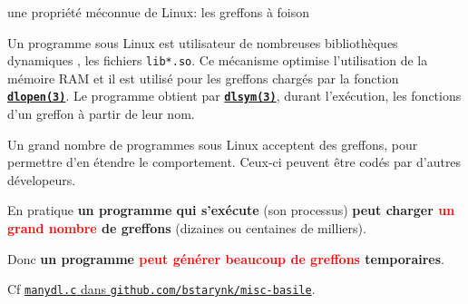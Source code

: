 \documentclass[final,a4,xcolor={svgnames,dvipsnames}]{beamer}
\begin{document}
 \begin{frame}{une propriété méconnue de Linux: les greffons à foison}


   Un programme sous Linux est {}
   utilisateur de nombreuses bibliothèques dynamiques
   {}, les fichiers
   \texttt{lib*.so}. Ce mécanisme optimise l'utilisation de la mémoire
   RAM et il est utilisé pour les greffons
   {} chargés par la fonction
   \textbf{\texttt{\href{https://man7.org/linux/man-pages/man3/dlopen.3.html}{dlopen(3)}}}. Le
   programme obtient par
   \textbf{\texttt{\href{https://man7.org/linux/man-pages/man3/dlsym.3.html}{dlsym(3)}}},
   durant l'exécution, les fonctions d'un greffon à partir de leur nom.

   \medskip
     
   Un grand nombre de programmes sous Linux {} acceptent des greffons,
   pour permettre d'en étendre le comportement. Ceux-ci peuvent être
   codés par d'autres dévelopeurs.

   \bigskip

   En pratique \textbf{un programme qui s'exécute} (son processus)
   \textbf{peut charger \textcolor{red}{un grand nombre} de greffons}
   (dizaines ou centaines de milliers).

   Donc \textbf{un programme \textcolor{red}{peut générer beaucoup de greffons}
     temporaires}.

   \smallskip

   \small{Cf
   \href{https://github.com/bstarynk/misc-basile/blob/master/manydl.c}{\texttt{manydl.c}
     dans \texttt{github.com/bstarynk/misc-basile}}.}

 \end{frame}
\end{document}
